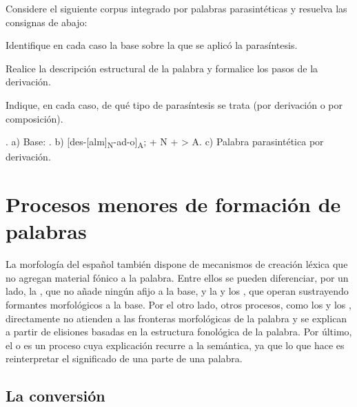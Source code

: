\begin{ejercicio}\label{ej:04-parasintesis}
Considere el siguiente corpus integrado por palabras parasintéticas y resuelva
las consignas de abajo:


\begin{consignas}
  \item Identifique en cada caso la base sobre la que se aplicó la parasíntesis.
  \item Realice la descripción estructural de la palabra y formalice los pasos
        de la derivación.
  \item Indique, en cada caso, de qué tipo de parasíntesis se trata (por
        derivación o por composición).
\end{consignas}

\begin{resuelto}
. a) Base: . b)
[des-[alm]\textsubscript{N}-ad-o]\textsubscript{A};  + N +
 > A. c) Palabra parasintética por derivación.
\end{resuelto}
\end{ejercicio}

\section{Procesos menores de formación de palabras}

La morfología del español también dispone de mecanismos de creación léxica que
no agregan material fónico a la palabra. Entre ellos se pueden diferenciar, por
un lado, la , que no añade ningún afijo a la base, y la
 y los , que operan
sustrayendo formantes morfológicos a la base. Por el otro lado, otros procesos,
como los  y los , directamente no
atienden a las fronteras morfológicas de la palabra y se explican a partir de
elisiones basadas en la estructura fonológica de la palabra. Por último, el
 o  es un proceso cuya
explicación recurre a la semántica, ya que lo que hace es reinterpretar el
significado de una parte de una palabra.

\subsection{La conversión}\label{sec:04-conversion}

